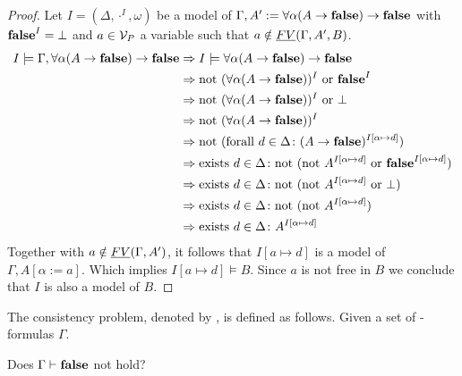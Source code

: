 \begin{proof}
	Let $I=(\Delta,\cdot^I,\omega)$ be a model of $\Gamma,A':=\forall\alpha(A\to\textbf{false})\to\textbf{false}$ with $\textbf{false}^I=\bot$ and $a\in\mathcal{V}_P$ a variable such that $a\notin\emph{FV}(\Gamma,A',B)$.
	\begin{align*}
		I\models\Gamma,\forall\alpha(A\to\textbf{false})\to\textbf{false} & \Rightarrow I\models\forall\alpha(A\to\textbf{false})\to\textbf{false}                                                          \\
        & \Rightarrow\text{not}~ (\forall\alpha(A\to\textbf{false}))^I~\text{or}~\textbf{false}^I                                                            \\
        & \Rightarrow\text{not}~ (\forall\alpha(A\to\textbf{false}))^I~\text{or}~\bot                                                                \\
        & \Rightarrow\text{not}~ (\forall\alpha(A\to\textbf{false}))^I                                                                   \\
        & \Rightarrow\text{not}~(\text{forall}~ d\in\Delta\colon(A\to\textbf{false})^{I\left[\alpha\mapsto d\right]})                               \\
        & \Rightarrow\text{exists}~ d\in\Delta\colon\text{not}~(\text{not}~A^{I\left[\alpha\mapsto d\right]}~\text{or}~\textbf{false}^{I\left[\alpha\mapsto d\right]}) \\
        & \Rightarrow\text{exists}~ d\in\Delta\colon\text{not}~(\text{not}~A^{I\left[\alpha\mapsto d\right]}~\text{or}~\bot)                                   \\
        & \Rightarrow\text{exists}~ d\in\Delta\colon\text{not}~(\text{not}~ A^{I\left[\alpha\mapsto d\right]})                                     \\
        & \Rightarrow\text{exists}~ d\in\Delta\colon A^{I\left[\alpha\mapsto d\right]}
	\end{align*}
	Together with $a\notin\emph{FV}(\Gamma,A')$, it follows that $I\left[a\mapsto d\right]$ is a model of $\Gamma,A\left[\alpha:=a\right]$. Which implies $I\left[a\mapsto d\right]\models B$.	Since $a$ is not free in $B$ we conclude that $I$ is also a model of $B$.
\end{proof}
\begin{definition}\label{def.3.4}
	The consistency problem, denoted by \PCons, is defined as follows.
	Given a set of \SysP-formulas $\Gamma$. 
	\begin{center}
		Does $\Gamma\vdash\textbf{false}$ not hold?
	\end{center}
\end{definition}
